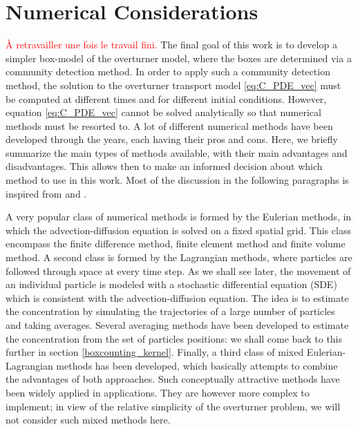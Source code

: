 \chapter{Numerical Considerations}
\textcolor{red}{À retravailler une fois le travail fini.}
The final goal of this work is to develop a simpler box-model of the overturner model, where the boxes are determined via a community detection method. In order to apply such a community detection method, the solution to the overturner transport model \eqref{eq:C_PDE_vec} must be computed at different times and for different initial conditions. However, equation \eqref{eq:C_PDE_vec} cannot be solved analytically so that numerical methods must be resorted to. A lot of different numerical methods have been developed through the years, each having their pros and cons. Here, we briefly summarize the main types of methods available, with their main advantages and disadvantages. This allows then to make an informed decision about which method to use in this work. Most of the discussion in the following paragraphs is inspired from \cite{spivakovskaya2007lagrangian} and \cite{spivakovskaya2007backward}. 

A very popular class of numerical methods is formed by the Eulerian methods, in which the advection-diffusion equation is solved on a fixed spatial grid. This class encompass the finite difference method, finite element method and finite volume method. A second class is formed by the Lagrangian methods, where particles are followed through space at every time step. As we shall see later, the movement of an individual particle is modeled with a stochastic differential equation (SDE) which is consistent with the advection-diffusion equation. The idea is to estimate the concentration by simulating the trajectories of a large number of particles and taking averages. Several averaging methods have been developed to estimate the concentration from the set of particles positions: we shall come back to this further in section \ref{boxcounting_kernel}. Finally, a third class of mixed Eulerian-Lagrangian methods has been developed, which basically attempts to combine the advantages of both approaches. Such conceptually attractive methods have been widely applied in applications. They are however more complex to implement; in view of the relative simplicity of the overturner problem, we will not consider such mixed methods here.

